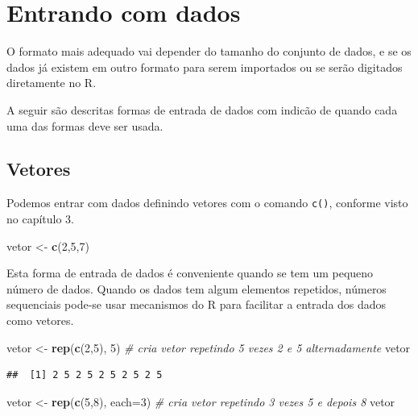 \documentclass[]{book}
\newenvironment{Shaded}{\begin{snugshade}}{\end{snugshade}}
\newcommand{\CommentTok}[1]{\textcolor[rgb]{0.56,0.35,0.01}{\textit{#1}}}
\newcommand{\DataTypeTok}[1]{\textcolor[rgb]{0.13,0.29,0.53}{#1}}
\newcommand{\DecValTok}[1]{\textcolor[rgb]{0.00,0.00,0.81}{#1}}
\newcommand{\KeywordTok}[1]{\textcolor[rgb]{0.13,0.29,0.53}{\textbf{#1}}}
\newcommand{\NormalTok}[1]{#1}
\newcommand{\StringTok}[1]{\textcolor[rgb]{0.31,0.60,0.02}{#1}}
\begin{document}
\hypertarget{entrando-com-dados}{%
\section{Entrando com dados}\label{entrando-com-dados}}

O formato mais adequado vai depender do tamanho do conjunto de dados, e se os dados já existem em outro formato para serem importados ou se serão digitados diretamente no R.

A seguir são descritas formas de entrada de dados com indicão de quando cada uma das formas deve ser usada.

\hypertarget{vetores}{%
\subsection{Vetores}\label{vetores}}

Podemos entrar com dados definindo vetores com o comando \texttt{c()}, conforme visto no capítulo 3.

\begin{Shaded}
\begin{Highlighting}[]
\NormalTok{vetor <-}\StringTok{ }\KeywordTok{c}\NormalTok{(}\DecValTok{2}\NormalTok{,}\DecValTok{5}\NormalTok{,}\DecValTok{7}\NormalTok{)}
\end{Highlighting}
\end{Shaded}

Esta forma de entrada de dados é conveniente quando se tem um pequeno número de dados. Quando os dados tem algum elementos repetidos, números sequenciais pode-se usar mecanismos do R para facilitar a entrada dos dados como vetores.

\begin{Shaded}
\begin{Highlighting}[]
\NormalTok{vetor <-}\StringTok{ }\KeywordTok{rep}\NormalTok{(}\KeywordTok{c}\NormalTok{(}\DecValTok{2}\NormalTok{,}\DecValTok{5}\NormalTok{), }\DecValTok{5}\NormalTok{)  }\CommentTok{# cria vetor repetindo 5 vezes 2 e 5 alternadamente}
\NormalTok{vetor}
\end{Highlighting}
\end{Shaded}

\begin{verbatim}
##  [1] 2 5 2 5 2 5 2 5 2 5
\end{verbatim}

\begin{Shaded}
\begin{Highlighting}[]
\NormalTok{vetor <-}\StringTok{ }\KeywordTok{rep}\NormalTok{(}\KeywordTok{c}\NormalTok{(}\DecValTok{5}\NormalTok{,}\DecValTok{8}\NormalTok{), }\DataTypeTok{each=}\DecValTok{3}\NormalTok{)  }\CommentTok{# cria vetor repetindo 3 vezes 5 e depois 8}
\NormalTok{vetor}
\end{Highlighting}
\end{Shaded}
\end{document}
